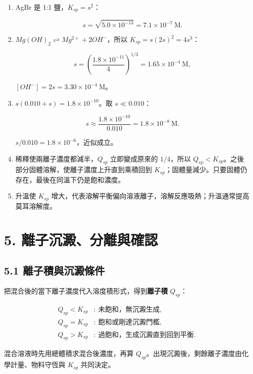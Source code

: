 \documentclass[11pt,a4paper]{article}
\begin{document}
\begin{enumerate}
\def\labelenumi{\arabic{enumi}.}
\item
  AgBr 是 1:1 鹽，\(K_{sp}=s^2\)：

  \[
  s=\sqrt{5.0\times10^{-13}}=7.1\times10^{-7}\ \mathrm M.
  \]
\item
  \(Mg(OH)_2\rightleftharpoons Mg^{2+}+2OH^-\)，所以 \(K_{sp}=s(2s)^2=4s^3\)：

  \[
  s=\left(\frac{1.8\times10^{-11}}4\right)^{1/3}=1.65\times10^{-4}\ \mathrm M,
  \]

  \([OH^-]=2s=3.30\times10^{-4}\ \mathrm M\)。
\item
  \(s(0.010+s)=1.8\times10^{-10}\)。取 \(s\ll0.010\)：

  \[
  s\approx\frac{1.8\times10^{-10}}{0.010}=1.8\times10^{-8}\ \mathrm M.
  \]

  \(s/0.010=1.8\times10^{-6}\)，近似成立。
\item
  稀釋使兩離子濃度都減半，\(Q_{sp}\) 立即變成原來的 \(1/4\)，所以 \(Q_{sp}<K_{sp}\)。之後部分固體溶解，使離子濃度上升直到乘積回到 \(K_{sp}\)；固體量減少。只要固體仍存在，最後在同溫下仍是飽和濃度。
\item
  升溫使 \(K_{sp}\) 增大，代表溶解平衡偏向溶液離子，溶解反應吸熱；升溫通常提高莫耳溶解度。
\end{enumerate}

\section{5. 離子沉澱、分離與確認}\label{ux96e2ux5b50ux6c89ux6fb1ux5206ux96e2ux8207ux78baux8a8d}

\subsection{5.1 離子積與沉澱條件}\label{ux96e2ux5b50ux7a4dux8207ux6c89ux6fb1ux689dux4ef6}

把混合後的當下離子濃度代入溶度積形式，得到\textbf{離子積} \(Q_{sp}\)：

\[
\begin{aligned}
Q_{sp}<K_{sp}&:\ \text{未飽和，無沉澱生成},\\
Q_{sp}=K_{sp}&:\ \text{飽和或剛達沉澱門檻},\\
Q_{sp}>K_{sp}&:\ \text{過飽和，生成沉澱直到回到平衡}.
\end{aligned}
\]

混合溶液時先用總體積求混合後濃度，再算 \(Q_{sp}\)。出現沉澱後，剩餘離子濃度由化學計量、物料守恆與 \(K_{sp}\) 共同決定。
\end{document}
